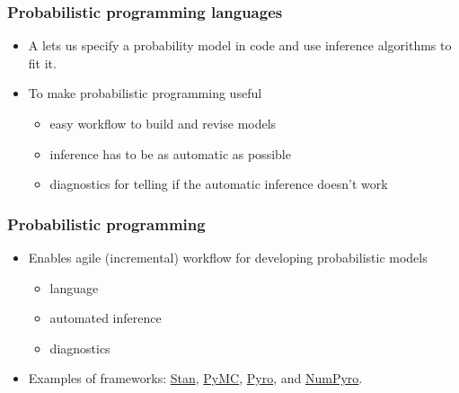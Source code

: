 \documentclass[10pt]{beamer}
\begin{document}
\begin{frame}
\frametitle{Probabilistic programming languages}

  \begin{itemize}
  \item A  lets us specify
    a probability model in code and use inference algorithms to fit it.
    \pause
  \item To make probabilistic programming useful
    \begin{itemize}
    \item easy workflow to build and revise models
    \item inference has to be as automatic as possible
    \item diagnostics for telling if the automatic inference doesn't work
    \end{itemize}
  \end{itemize}
\end{frame}

\begin{frame}

\frametitle{Probabilistic programming}

  \begin{itemize}
  \item Enables agile (incremental) workflow for developing probabilistic models
    \begin{itemize}
    \item language
    \item automated inference
    \item diagnostics
    \end{itemize}
  \item Examples of frameworks:
    \href{https://mc-stan.org/}{Stan},
    \href{https://www.pymc.io/}{PyMC},
    \href{https://pyro.ai/}{Pyro}, and
    \href{https://num.pyro.ai/}{NumPyro}.
  \end{itemize}

\end{frame}
\end{document}
